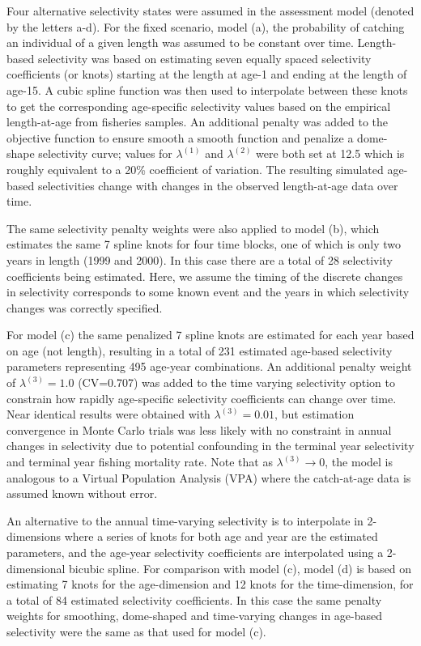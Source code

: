 Four alternative selectivity states were assumed in the assessment model (denoted by the letters a-d).  For the fixed scenario, model (a), the probability of catching an individual of a given length was assumed to be constant over time.  Length-based selectivity was based on estimating seven equally spaced selectivity coefficients (or knots) starting at the length at age-1 and ending at the length of age-15.  A cubic spline function was then used to interpolate between these knots to get the corresponding age-specific selectivity values based on the empirical length-at-age from fisheries samples.  An additional penalty was added to the objective function to ensure smooth a smooth function and penalize a dome-shape selectivity curve; values for $\lambda^{(1)}$ and $\lambda^{(2)}$ were both set at 12.5 which is roughly equivalent to a 20\% coefficient of variation.  The resulting simulated age-based selectivities change with changes in the observed length-at-age data over time.

The same selectivity penalty weights were also applied to model (b), which estimates the same 7 spline knots for four time blocks, one of which is only two years in length (1999 and 2000).  In this case there are a total of 28 selectivity coefficients being estimated.  Here, we assume the timing of the discrete changes in selectivity corresponds to some known event and the years in which selectivity changes was correctly specified.  

For model (c) the same penalized 7 spline knots are estimated for each year based on age (not length), resulting in a total of 231 estimated age-based selectivity parameters representing 495 age-year combinations.  An additional penalty weight of $\lambda^{(3)}=1.0$ (CV=0.707) was added to the time varying selectivity option to constrain how rapidly age-specific selectivity coefficients can change over time.  Near identical results were  obtained with $\lambda^{(3)}=0.01$, but estimation convergence in Monte Carlo trials was less likely with no constraint in annual changes in selectivity due to potential confounding in the terminal year selectivity and terminal year fishing mortality rate.  Note that as $\lambda^{(3)}\rightarrow 0$, the model is analogous to a Virtual Population Analysis (VPA) where the catch-at-age data is assumed known without error.

An alternative to the annual time-varying selectivity is to interpolate in 2-dimensions where a series of knots for both age and year are the estimated parameters, and the age-year selectivity coefficients are interpolated using a 2-dimensional bicubic spline.  For comparison with model (c), model (d) is based on estimating 7 knots for the age-dimension and 12 knots for the time-dimension, for a total of 84 estimated selectivity coefficients.  In this case the same penalty weights for smoothing, dome-shaped and time-varying changes in age-based selectivity were the same as that used for model (c).  

